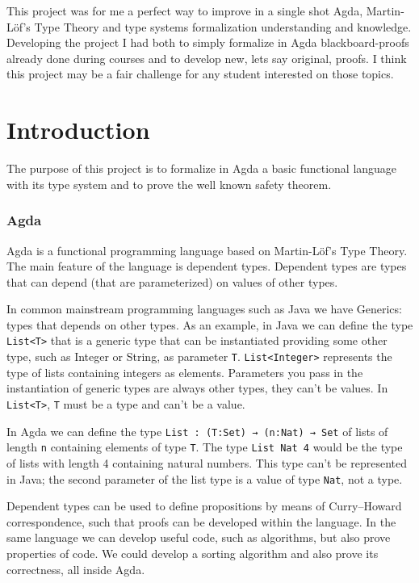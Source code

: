 \documentclass{article}
\begin{document}
\vspace{1em}
This project was for me a perfect way to improve in a single shot Agda, Martin-Löf's Type Theory and type systems formalization understanding and knowledge.
Developing the project I had both to simply formalize in Agda blackboard-proofs already done during courses and to develop new, lets say original, proofs.
I think this project may be a fair challenge for any student interested on those topics.


\section{Introduction}

The purpose of this project is to formalize in Agda a basic functional language with its type system and to prove the well known safety theorem.


\subsubsection*{Agda}
Agda is a functional programming language based on Martin-Löf's Type Theory.
The main feature of the language is dependent types.
Dependent types are types that can depend (that are parameterized) on values of other types.

In common mainstream programming languages such as Java we have Generics: types that depends on other types.
As an example, in Java we can define the type \texttt{List<T>} that is a generic type that can be instantiated providing some other type, such as Integer or String, as parameter \texttt{T}.
\texttt{List<Integer>} represents the type of lists containing integers as elements.
Parameters you pass in the instantiation of generic types are always other types, they can't be values.
In \texttt{List<T>}, \texttt{T} must be a type and can't be a value.

In Agda we can define the type \texttt{List : (T:Set) → (n:Nat) → Set} of lists of length \texttt{n} containing elements of type \texttt{T}.
The type \texttt{List Nat 4} would be the type of lists with length 4 containing natural numbers.
This type can't be represented in Java; the second parameter of the list type is a value of type \texttt{Nat}, not a type.

Dependent types can be used to define propositions by means of Curry–Howard correspondence, such that proofs can be developed within the language.
In the same language we can develop useful code, such as algorithms, but also prove properties of code.
We could develop a sorting algorithm and also prove its correctness, all inside Agda.
\end{document}
